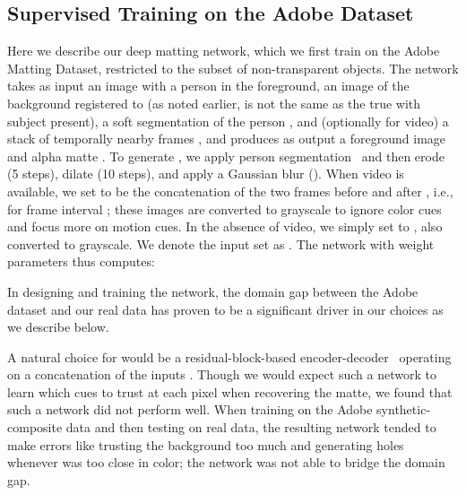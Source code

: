 \documentclass[10pt,twocolumn,letterpaper]{article}
\begin{document}
\subsection{Supervised Training on the Adobe Dataset}
\label{sec:sup_train}
Here we describe our deep matting network, which we first train on the Adobe Matting Dataset, restricted to the subset of non-transparent objects.  The network takes as input an image  with a person in the foreground, an image of the background  registered to  (as noted earlier,  is not the same as the true  with subject present), a soft segmentation of the person , and (optionally for video) a stack of temporally nearby frames , and produces as output a foreground image  and alpha matte .  To generate , we apply person segmentation~\cite{deeplabv3plus2018} and then erode (5 steps), dilate (10 steps), and apply a Gaussian blur ().  When video is available, we set  to be the concatenation of the two frames before and after , i.e.,  for frame interval ; these images are converted to grayscale to ignore color cues and focus more on motion cues. In the absence of video, we simply set  to , also converted to grayscale.  We denote the input set as . The network with weight parameters  thus computes:
\vspace{-0.5em}



In designing and training the network, the domain gap between the Adobe dataset and our real data has proven to be a significant driver in our choices as we describe below.

A natural choice for  would be a residual-block-based encoder-decoder~\cite{zhu2017unpaired} operating on a concatenation of the inputs .  Though we would expect such a network to learn which cues to trust at each pixel when recovering the matte, we found that such a network did not perform well.  When training on the Adobe synthetic-composite data and then testing on real data, the resulting network tended to make errors like trusting the background  too much and generating holes whenever  was too close in color; the network was not able to bridge the domain gap.
\end{document}
